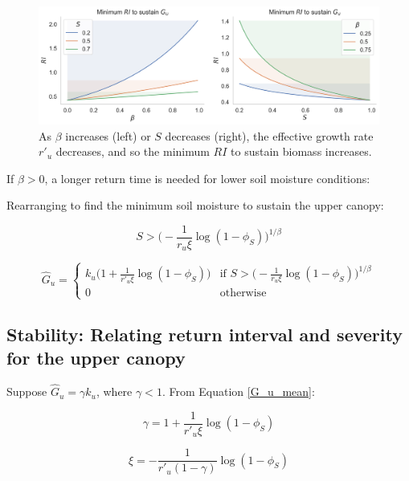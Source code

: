 \documentclass{article}
\begin{document}
\begin{figure}[h]
 \centering
  \includegraphics[width=33pc]{../fire_plots/stability_min_RI.png}
 \caption{ As $\beta$ increases (left) or $S$ decreases (right), the effective growth rate $r'_u$ decreases, and so the minimum $RI$ to sustain biomass increases. }
 \label{fig:stability_min_RI.png}
 \end{figure}
 
        
If $\beta>0$, a longer return time is needed for lower soil moisture conditions:


Rearranging to find the minimum soil moisture to sustain the upper canopy:

\begin{equation}
S > \bigg( - \frac{1}{r_u \xi }\log (1 - \phi_S)\bigg)^{1/\beta}
\end{equation}

\begin{equation}
\hat{G}_u  =
    \begin{cases}
       k_u \big( 1 + \frac{1}{r'_u \xi} \log(1-\phi_S) \big)
	  & \text{if  } S > \big( - \frac{1}{r_u \xi }\log (1 - \phi_S)\big)^{1/\beta}
		\\[10pt]
      0 & \text{otherwise}
    \end{cases}
\end{equation}



\subsection{Stability: Relating return interval and severity for the upper canopy}
        
        Suppose $\hat G_u = \gamma k_u$, where $\gamma<1$. From  Equation \ref{G_u_mean}:
        
        \begin{equation}
        \gamma =  1 + \frac{1}{r'_u \xi} \log(1-\phi_S)
        \end{equation}
        
        \begin{equation}
        \xi = -\frac{1}{r'_u (1-\gamma) }\log(1-\phi_S)
        \end{equation}
        
\end{document}
